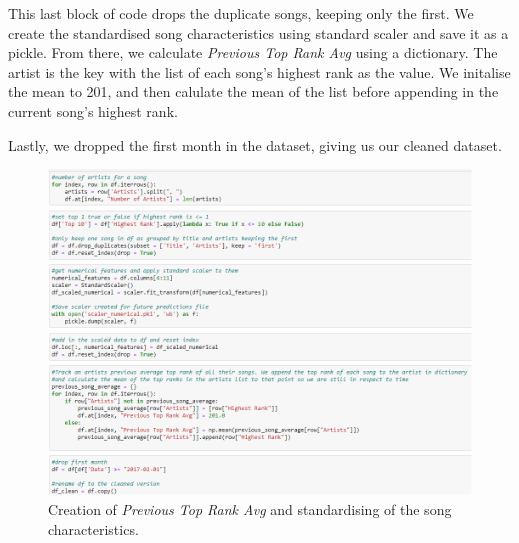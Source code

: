 \documentclass{article}
\begin{document}
\begin{appendices}
This last block of code drops the duplicate songs, keeping only the first. We create the standardised song characteristics using standard scaler and save it as a pickle. From there, we calculate \textit{Previous Top Rank Avg} using a dictionary. The artist is the key with the list of each song's highest rank as the value. We initalise the mean to 201, and then calulate the mean of the list before appending in the current song's highest rank.

Lastly, we dropped the first month in the dataset, giving us our cleaned dataset.

\begin{figure}[H]
  \centering
  \includegraphics[width=0.9\linewidth]{topRankAvgCode.png}
  \caption{Creation of \textit{Previous Top Rank Avg} and standardising of the song characteristics.}
  \label{fig:dist}
\end{figure}





\end{appendices}
\end{document}
